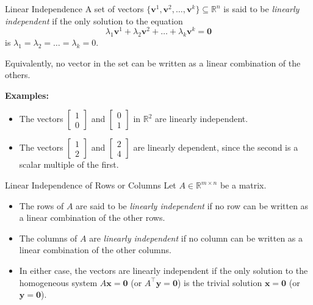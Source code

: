 \begin{definition}{Linear Independence}{}
A set of vectors \( \{ \mathbf{v}^1, \mathbf{v}^2, \dots, \mathbf{v}^k \} \subseteq \mathbb{R}^n \) is said to be \emph{linearly independent} if the only solution to the equation
\[
\lambda_1 \mathbf{v}^1 + \lambda_2 \mathbf{v}^2 + \dots + \lambda_k \mathbf{v}^k = \mathbf{0}
\]
is \( \lambda_1 = \lambda_2 = \dots = \lambda_k = 0 \).  

Equivalently, no vector in the set can be written as a linear combination of the others.
\end{definition}

\textbf{Examples:}
\begin{itemize}
    \item The vectors \( \begin{bmatrix}1\\0\end{bmatrix} \) and \( \begin{bmatrix}0\\1\end{bmatrix} \) in \( \mathbb{R}^2 \) are linearly independent.
    \item The vectors \( \begin{bmatrix}1\\2\end{bmatrix} \) and \( \begin{bmatrix}2\\4\end{bmatrix} \) are linearly dependent, since the second is a scalar multiple of the first.
\end{itemize}

\vspace{1em}

\begin{definition}{Linear Independence of Rows or Columns}{}
Let \( A \in \mathbb{R}^{m \times n} \) be a matrix.

\begin{itemize}
  \item The rows of \( A \) are said to be \emph{linearly independent} if no row can be written as a linear combination of the other rows.
  
  \item The columns of \( A \) are \emph{linearly independent} if no column can be written as a linear combination of the other columns.
  
  \item In either case, the vectors are linearly independent if the only solution to the homogeneous system \( A \mathbf{x} = \mathbf{0} \) (or \( A^\top \mathbf{y} = \mathbf{0} \)) is the trivial solution \( \mathbf{x} = \mathbf{0} \) (or \( \mathbf{y} = \mathbf{0} \)).
\end{itemize}
\end{definition}

